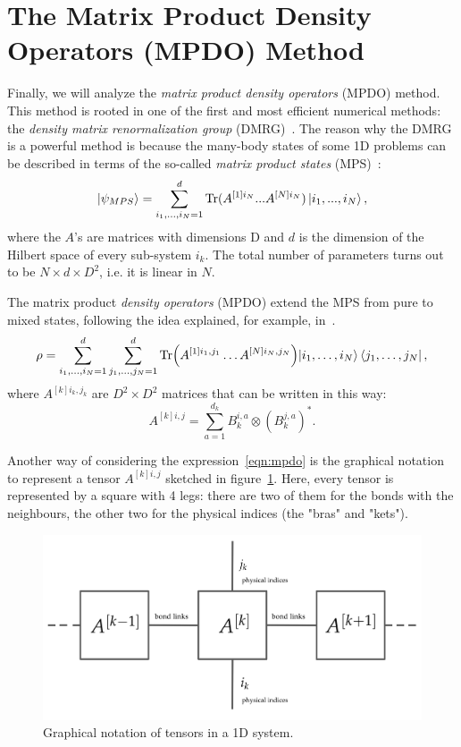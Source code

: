 \section{The Matrix Product Density Operators (MPDO) Method}
Finally, we will analyze the \emph{matrix product density operators} (MPDO) method.
This method is rooted in one of the first and most efficient numerical methods: the \emph{density matrix renormalization group} (DMRG)~\cite{s_white:dmrg}. The reason why the DMRG is a powerful method is because the many-body states of some 1D problems can be described in terms of the so-called \emph{matrix product states} (MPS)~\cite{PhysRevLett.93.207204, PhysRevLett:from_dmrg_to_mps}:
\begin{equation}
    \ket{\psi_{MPS}} = \sum_{i_1, ..., i_N = 1}^{d} \operatorname{Tr}(A^{[1]i_N}...A^{[N]i_N}) \ket{i_1,...,i_N},
\end{equation}
where the $A$'s are matrices with dimensions D and $d$ is the dimension of the Hilbert space of every sub-system $i_k$. The total number of parameters turns out to be $N \times d \times D^2$, i.e. it is linear in $N$.

The matrix product \emph{density operators} (MPDO) extend the MPS from pure to mixed states, following the idea explained, for example, in~\cite{PhysRevLett.93.207204}. 
\begin{equation}
\label{eqn:mpdo}
    \rho = \sum_{i_1, \dots ,i_N = 1}^{d} \sum_{j_1, \dots ,j_N = 1}^{d} \operatorname{Tr}\Bigl(A^{[1]i_1,j_1} \dots A^{[N]i_N,j_N}\Bigl) \ket{i_1, \dots ,i_N}\bra{j_1, \dots ,j_N},
\end{equation}
where $A^{[k]i_k,j_k}$ are $D^2 \times D^2$ matrices that can be written in this way:
\begin{equation}
    A^{[k] i,j} = \sum_{a = 1}^{d_k} B_k^{i,a} \otimes (B_k^{j,a})^*.
\end{equation}

Another way of considering the expression~\ref{eqn:mpdo} is the graphical notation to represent a tensor $A^{[k] i,j}$ sketched in figure~\ref{fig:tensor_network}. Here, every tensor is represented by a square with 4 legs: there are two of them for the bonds with the neighbours, the other two for the physical indices (the "bras" and "kets"). 

\begin{figure}[H]
    \centering
    \includegraphics[scale=0.30]{Figures/tensor_network.png}
    \caption{Graphical notation of tensors in a 1D system.}
    \label{fig:tensor_network}
\end{figure}

